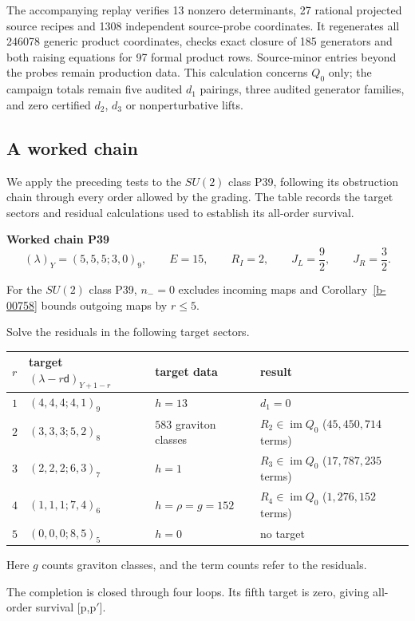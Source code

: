 \documentclass[11pt]{article}
\numberwithin{equation}{section}
\numberwithin{figure}{section}
\numberwithin{table}{section}
\begin{document}
The accompanying replay verifies 13 nonzero determinants, 27 rational projected source recipes and 1308 independent source-probe coordinates. It regenerates all 246078 generic product coordinates, checks exact closure of 185 generators and both raising equations for 97 formal product rows. Source-minor entries beyond the probes remain production data. This calculation concerns $Q_0$ only; the campaign totals remain five audited $d_1$ pairings, three audited generator families, and zero certified $d_2$, $d_3$ or nonperturbative lifts.

\subsection{A worked chain}\label{sec-E-chain}

We apply the preceding tests to the $SU(2)$ class P39, following its obstruction chain through every order allowed by the grading. The table records the target sectors and residual calculations used to establish its all-order survival.

\begin{proofbox}
\textbf{Worked chain P39}
\begin{equation*}
(\lambda)_Y=(5,5,5;3,0)_9,\qquad E=15,\qquad R_I=2,\qquad J_L=\frac92,\qquad J_R=\frac32.
\end{equation*}

For the $SU(2)$ class P39, $n_-=0$ excludes incoming maps and Corollary~\ref{b-00758} bounds outgoing maps by $r\le5$.

Solve the residuals in the following target sectors.

{\small\renewcommand{\arraystretch}{1.25}\setlength{\tabcolsep}{4pt}
\begin{xltabular}{\linewidth}{@{}l>{\raggedright\arraybackslash}X>{\raggedright\arraybackslash}X>{\raggedright\arraybackslash}X@{}}
\toprule
$r$ & target $(\lambda-r\mathsf d)_{Y+1-r}$ & target data & result\\
\midrule\endhead
$1$ & $(4,4,4;4,1)_9$ & $h=13$ & $d_1=0$\\
$2$ & $(3,3,3;5,2)_8$ & $583$ graviton classes & $R_2\in\operatorname{im}Q_0$ ($45{,}450{,}714$ terms)\\
$3$ & $(2,2,2;6,3)_7$ & $h=1$ & $R_3\in\operatorname{im}Q_0$ ($17{,}787{,}235$ terms)\\
$4$ & $(1,1,1;7,4)_6$ & $h=\rho=g=152$ & $R_4\in\operatorname{im}Q_0$ ($1{,}276{,}152$ terms)\\
$5$ & $(0,0,0;8,5)_5$ & $h=0$ & no target\\
\bottomrule
\end{xltabular}}

Here $g$ counts graviton classes, and the term counts refer to the residuals.

The completion is closed through four loops. Its fifth target is zero, giving all-order survival [p,p$\prime$].
\end{proofbox}
\end{document}

